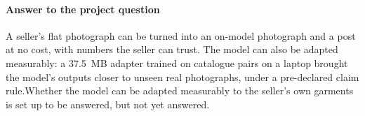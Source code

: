\paragraph{Answer to the project question} A seller's flat photograph can be turned into an on-model photograph and a post at no cost, with numbers the seller can trust. \ifLora The model can also be adapted measurably: a 37.5~MB adapter trained on catalogue pairs on a laptop brought the model's outputs closer to unseen real photographs, under a pre-declared claim rule.\else Whether the model can be adapted measurably to the seller's own garments is set up to be answered, but not yet answered.\fi
